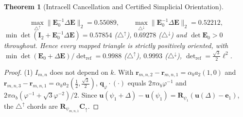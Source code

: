 \documentclass[11pt,a4paper]{article}
\newtheorem{theorem}{Theorem}[section]
\theoremstyle{definition}
\theoremstyle{remark}
\begin{document}
\begin{theorem}[Intracell Cancellation and Certified Simplicial Orientation]
\begin{enumerate}[noitemsep]
    \begin{equation}
    \max_{\triangle^{\uparrow}} \|\mathbf{E}_0^{-1}\Delta\mathbf{E}\|_2 = 0.55089, \qquad \max_{\triangle^{\downarrow}} \|\mathbf{E}_0^{-1}\Delta\mathbf{E}\|_2 = 0.52212,
    \end{equation}
    $\min\det(\mathbf{I}_2+\mathbf{E}_0^{-1}\Delta\mathbf{E}) = 0.57854$ ($\triangle^{\uparrow}$), $0.69278$ ($\triangle^{\downarrow}$) and $\det\mathbf{E}_0>0$ throughout. Hence every mapped triangle is strictly positively oriented, with $\min \det(\mathbf{E}_0+\Delta\mathbf{E})/\det_{\text{ref}} = 0.9988$ ($\triangle^{\uparrow}$), $0.9993$ ($\triangle^{\downarrow}$), $\det_{\text{ref}} = \tfrac{\sqrt3}{2}\ell^2$.
\end{enumerate}
\end{theorem}
\begin{proof}
(1) $I_{m,n}$ does not depend on $k$. With $\mathbf{r}_{m,n,2}-\mathbf{r}_{m,n,1} = \alpha_b a_2(1,0)$ and $\mathbf{r}_{m,n,3}-\mathbf{r}_{m,n,1} = \alpha_b a_2(\tfrac12,\tfrac{\sqrt3}{2})$, $\mathbf{q}_\varphi\cdot(\cdot)$ equals $2\pi\alpha_b\varphi^{-1}$ and $2\pi\alpha_b(\varphi^{-1}+\sqrt3\varphi^{-2})/2$. Since $\mathbf{u}(\psi_1+\Delta)-\mathbf{u}(\psi_1) = \mathbf{R}_{\psi_1}(\mathbf{u}(\Delta)-\mathbf{e}_1)$, the $\triangle^{\uparrow}$ chords are $\mathbf{R}_{\psi_{m,n,1}}\mathbf{C}_{\uparrow}$.


\end{proof}
\end{document}
